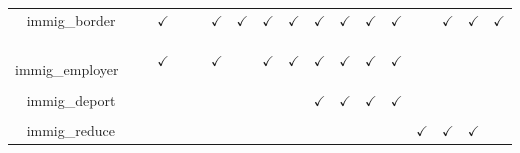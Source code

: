 \documentclass[
  12pt]{article}
\begin{document}
\begin{table}[H]
{\begin{tabular}{lcccccccccccccccc}
$\hspace{10pt}$immig\_border &  & $\checkmark$ &  &  & $\checkmark$ & $\checkmark$ & $\checkmark$ & $\checkmark$ & $\checkmark$ & $\checkmark$ & $\checkmark$ & $\checkmark$ &  & $\checkmark$ & $\checkmark$ & $\checkmark$\\
\cellcolor{gray!6}{$\hspace{10pt}$immig\_police} & \cellcolor{gray!6}{} & \cellcolor{gray!6}{} & \cellcolor{gray!6}{} & \cellcolor{gray!6}{} & \cellcolor{gray!6}{$\checkmark$} & \cellcolor{gray!6}{$\checkmark$} & \cellcolor{gray!6}{$\checkmark$} & \cellcolor{gray!6}{$\checkmark$} & \cellcolor{gray!6}{$\checkmark$} & \cellcolor{gray!6}{$\checkmark$} & \cellcolor{gray!6}{} & \cellcolor{gray!6}{$\checkmark$} & \cellcolor{gray!6}{} & \cellcolor{gray!6}{} & \cellcolor{gray!6}{} & \cellcolor{gray!6}{}\\
$\hspace{10pt}$immig\_employer &  & $\checkmark$ &  &  & $\checkmark$ &  & $\checkmark$ & $\checkmark$ & $\checkmark$ & $\checkmark$ & $\checkmark$ & $\checkmark$ &  &  &  & \\
\cellcolor{gray!6}{$\hspace{10pt}$immig\_services} & \cellcolor{gray!6}{} & \cellcolor{gray!6}{} & \cellcolor{gray!6}{} & \cellcolor{gray!6}{} & \cellcolor{gray!6}{} & \cellcolor{gray!6}{} & \cellcolor{gray!6}{$\checkmark$} & \cellcolor{gray!6}{$\checkmark$} & \cellcolor{gray!6}{} & \cellcolor{gray!6}{} & \cellcolor{gray!6}{} & \cellcolor{gray!6}{} & \cellcolor{gray!6}{} & \cellcolor{gray!6}{} & \cellcolor{gray!6}{} & \cellcolor{gray!6}{}\\
$\hspace{10pt}$immig\_deport &  &  &  &  &  &  &  &  & $\checkmark$ & $\checkmark$ & $\checkmark$ & $\checkmark$ &  &  &  & \\
\cellcolor{gray!6}{$\hspace{10pt}$immig\_report} & \cellcolor{gray!6}{} & \cellcolor{gray!6}{} & \cellcolor{gray!6}{} & \cellcolor{gray!6}{} & \cellcolor{gray!6}{} & \cellcolor{gray!6}{} & \cellcolor{gray!6}{} & \cellcolor{gray!6}{} & \cellcolor{gray!6}{} & \cellcolor{gray!6}{} & \cellcolor{gray!6}{} & \cellcolor{gray!6}{$\checkmark$} & \cellcolor{gray!6}{$\checkmark$} & \cellcolor{gray!6}{$\checkmark$} & \cellcolor{gray!6}{$\checkmark$} & \cellcolor{gray!6}{$\checkmark$}\\
$\hspace{10pt}$immig\_reduce &  &  &  &  &  &  &  &  &  &  &  &  & $\checkmark$ & $\checkmark$ & $\checkmark$ & \\

\end{tabular}}
\end{table}
\end{document}
